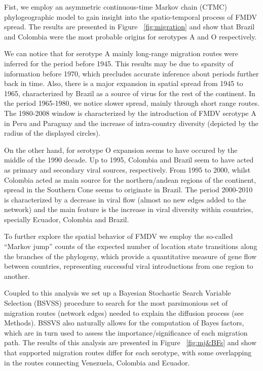 \documentclass[10pt]{article}
\begin{document}
Fist, we employ an asymmetric continuous-time Markov chain (CTMC) phylogeographic model \cite{roots} to gain insight into the spatio-temporal process of FMDV spread.
The results are presented in Figure ~\ref{fig:migration} and show that Brazil and Colombia were the most probable origins for serotypes A and O respectively.

We can notice that for serotype A mainly long-range migration routes were inferred for the period before 1945.
This results may be due to sparsity of information before 1970, which precludes accurate inference about periods further back in time. 
Also, there is a major expansion in spatial spread from 1945 to 1965, characterized by Brazil as a source of virus for the rest of the continent.
In the period 1965-1980, we notice slower spread, mainly through short range routes.
The 1980-2008 window is characterized by the introduction of FMDV serotype A in Peru and Paraguay and the increase of intra-country diversity (depicted by the radius of the displayed circles).   

On the other hand, for serotype O expansion seems to have occured by the middle of the 1990 decade.
Up to 1995, Colombia and Brazil seem to have acted as primary and secondary viral sources, respectively.
From 1995 to 2000, whilst Colombia acted as main source for the northern/andean regions of the continent, spread in the Southern Cone seems to originate in Brazil.
The period 2000-2010 is characterized by a decrease in viral flow (almost no new edges added to the network) and the main feature is the increase in viral diversity within countries, specially Ecuador, Colombia and Brazil.
	
To further explore the spatial behavior of FMDV we employ the so-called ``Markov jump'' counts \cite{Minin2008} of the expected number of location state transitions along the  branches of the phylogeny, which  provide a quantitative measure of gene flow between countries, representing successful viral introductions from one region to another.

Coupled to this analysis we set up a Bayesian Stochastic Search Variable Selection (BSVSS) procedure to search for the most parsimonious set of migration routes (network edges) needed to explain the diffusion process (see Methods).
BSSVS also naturally allows for the computation of Bayes factors, which are in turn used to assess the importance/significance of each migration path.
The results of this analysis are presented in Figure ~\ref{fig:mj&BFs} and show that supported migration routes differ for each serotype, with some overlapping in the routes connecting Venezuela, Colombia and Ecuador.
\end{document}
